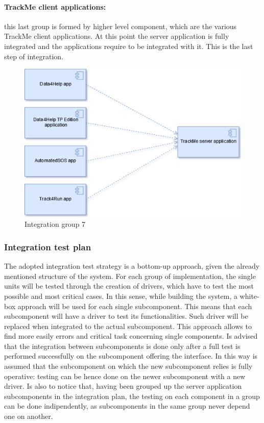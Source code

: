 \paragraph{TrackMe client applications:} this last group is formed by higher level component, which are the various TrackMe client applications. At this point the server application is fully integrated and the applications require to be integrated with it. This is the last step of integration.
\begin{figure}[H]
    \includegraphics[width=.7\linewidth, keepaspectratio]{./Images/Section5/integration_g7.png}
    \centering
    \caption{Integration group 7}
    \label{fig:intg7}
 \end{figure}

{\color{secblue}\subsubsection{Integration test plan}}
The adopted integration test strategy is a bottom-up approach, given the already mentioned structure of the system. For each group of implementation, the single units will be tested through the creation of drivers, which have to test the most possible and most critical cases. In this sense, while building the system, a white-box approach will be used for each single subcomponent. This means that each subcomponent will have a driver to test its functionalities. Such driver will be replaced when integrated to the actual subcomponent. This approach allows to find more easily errors and critical task concerning single components.
\newline Is advised that the integration between subcomponents is done only after a full test is performed successfully on the subcomponent offering the interface. In this way is assumed that the subcomponent on which the new subcomponent relies is fully operative: testing can be hence done on the newer subcomponent with a new driver.
\newline Is also to notice that, having been grouped up the server application subcomponents in the integration plan, the testing on each component in a group can be done indipendently, as subcomponents in the same group never depend one on another.

